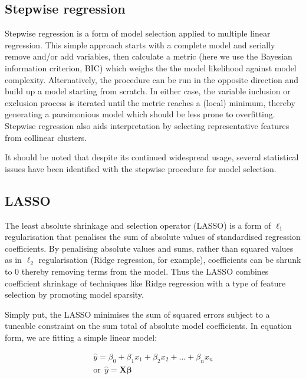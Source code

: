 \documentclass[a4paper,11pt,oneside]{book}
\begin{document}
\subsection{Stepwise regression}\label{meth:stepregress}

Stepwise regression is a form of model selection applied to multiple linear regression. This simple approach starts with a complete model and serially remove and/or add variables, then calculate a metric (here we use the Bayesian information criterion, BIC) which weighs the the model likelihood against model complexity. Alternatively, the procedure can be run in the opposite direction and build up a model starting from scratch. In either case, the variable inclusion or exclusion process is iterated until the metric reaches a (local) minimum, thereby generating a  parsimonious model which should be less prone to overfitting. Stepwise regression also aids interpretation by selecting representative features from collinear clusters.\cite{Mantel1970} 

It should be noted that despite its continued widespread usage, several statistical issues have been identified with the stepwise procedure for model selection.\cite{Hurvich1990, Whittingham2006}

\subsection{LASSO}\label{meth:lasso}

The least absolute shrinkage and selection operator (LASSO) is a form of $\ell_1$ regularisation that penalises the sum of absolute values of standardised regression coefficients. By penalising absolute values and sums, rather than squared values as in $\ell_2$ regularisation (Ridge regression, for example), coefficients can be shrunk to $0$ thereby removing terms from the model. Thus the LASSO combines coefficient shrinkage of techniques like Ridge regression with a type of feature selection by promoting model sparsity.\cite{Tibshirani1994, Hastie2001}

Simply put, the LASSO minimises the sum of squared errors subject to a tuneable constraint on the sum total of absolute model coefficients. In equation form, we are fitting a simple linear model:

\begin{equation}
\begin{aligned}
\hat{y} = \beta_0 + \beta_1 x_1 + \beta_2 x_2 + \ldots + \beta_n x_n\\
\mathrm{or}~~\hat{y} = \bm{X}\bm{\beta} %
\end{aligned}
\end{equation} \vspace{.2em}
\end{document}

